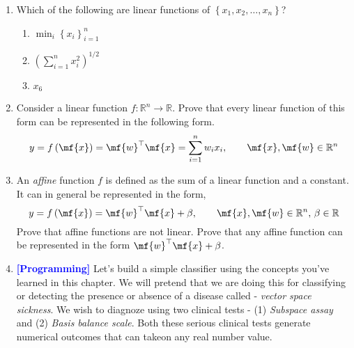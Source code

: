 \begin{enumerate}
    \item Which of the following are linear functions of $\left\{x_1, x_2, \ldots,x_n\right\}$?
    \begin{enumerate}
        \item $\min_i \left\{x_i\right\}_{i=1}^{n}$
        \item $\left(\sum_{i=1}^n x_i^2\right)^{1/2}$
        \item $x_6$
    \end{enumerate}

    \item Consider a linear function $f: \mathbb{R}^n \rightarrow \mathbb{R}$. Prove that every linear function of this form can be represented in the following form.
    \[ y = f\left(\mf{x}\right) = \mf{w}^\top\mf{x} = \sum_{i=1}^{n}w_ix_i, \quad \quad \mf{x}, \mf{w} \in \mathbb{R}^n \]

    \item An \textit{affine} function $f$ is defined as the sum of a linear function and a constant. It can in general be represented in the form, 
    \[ y = f\left(\mf{x}\right) = \mf{w}^\top\mf{x} + \beta, \quad \quad \mf{x}, \mf{w} \in \mathbb{R}^n, \, \beta \in \mathbb{R} \]
    Prove that affine functions are not linear. Prove that any affine function can be represented in the form $\mf{w}^\top\mf{x} + \beta$.

    \item \textcolor{blue}{\textbf{[Programming]}} Let's build a simple classifier using the concepts you've learned in this chapter. We will pretend that we are doing this for classifying or detecting the presence or absence of a disease called - \textit{vector space sickness}. We wish to diagnoze using two clinical tests - (1) \textit{Subspace assay} and (2) \textit{Basis balance scale}. Both these serious clinical tests generate numerical outcomes that can takeon any real number value.
    

\end{enumerate}
